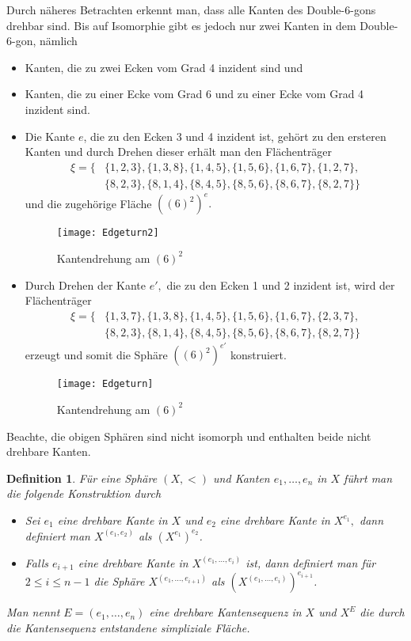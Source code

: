 \documentclass[12pt,titlepage,twoside,cleardoublepage]{article}
\theoremstyle{nummermitklammern}
\newtheorem{definition}[temp]{Definition}
\newtheorem{definition}[zahl]{Definition}
\numberwithin{equation}{section}
\begin{document}
Durch näheres Betrachten erkennt man, dass alle Kanten des Double-6-gons drehbar sind. Bis auf Isomorphie gibt es jedoch nur zwei Kanten in dem Double-6-gon, nämlich 
\begin{itemize}
\item Kanten, die zu zwei Ecken vom Grad 4 inzident sind und
\item Kanten, die zu einer Ecke vom Grad 6 und zu einer Ecke vom Grad 4 inzident sind.
\end{itemize}
\begin{itemize}
\item Die Kante $e$, die zu den Ecken 3 und 4 inzident ist, gehört zu den ersteren Kanten und durch Drehen dieser erhält man den Flächenträger 
\begin{align*}
\xi=\{&\{1,2,3\},\{1,3,8\},\{1,4,5\},\{1,5,6\},\{1,6,7\},\{1,2,7\},\\ 
&\{8,2,3\},\{8,1,4\},\{8,4,5\},\{8,5,6\},\{8,6,7\},\{8,2,7\}\}
\end{align*}
und die zugehörige Fläche ${((6)^2)}^e.$
\begin{figure}[H]
\begin{center}
\texttt{[image: Edgeturn2]}
\end{center}
\caption{Kantendrehung am $(6)^2$ }
\end{figure}
\item Durch Drehen der Kante $e',$ die zu den Ecken 1 und 2 inzident ist, wird der Flächenträger 
\begin{align*}
\xi=\{&\{1,3,7\},\{1,3,8\},\{1,4,5\},\{1,5,6\},\{1,6,7\},\{2,3,7\},\\ 
&\{8,2,3\},\{8,1,4\},\{8,4,5\},\{8,5,6\},\{8,6,7\},\{8,2,7\}\}
\end{align*}
erzeugt und somit die Sphäre ${((6)^2)}^{e'}$ konstruiert.
\begin{figure}[H]
\begin{center}
\texttt{[image: Edgeturn]}
\end{center}
\caption{Kantendrehung am $(6)^2$ }
\end{figure}
\end{itemize}
Beachte, die obigen Sphären sind nicht isomorph und enthalten beide nicht drehbare Kanten.
\begin{definition}
Für eine Sphäre $(X,<)$ und Kanten $e_1,\ldots,e_n$ in $X$ führt man die folgende Konstruktion durch
\begin{itemize}
\item Sei $e_1$ eine drehbare Kante in $X$ und $e_2$ eine drehbare Kante in $X^{e_1},$ dann definiert man $X^{(e_1,e_2)}$ als $(X^{e_1})^{e_2}$.
\item Falls $e_{i+1}$ eine drehbare Kante in $X^{(e_1,\ldots,e_{i})}$ ist, dann definiert man für $2\leq i\leq n-1$ die Sphäre $X^{(e_1,\ldots,e_{i+1})}$ als $(X^{(e_1,\ldots,e_{i})})^{e_{i+1}}$.
\end{itemize}
Man nennt $E=(e_1,\ldots,e_n)$ eine drehbare Kantensequenz in $X$ und $X^E$ die durch die Kantensequenz entstandene simpliziale Fläche. 
\end{definition}
\end{document}
